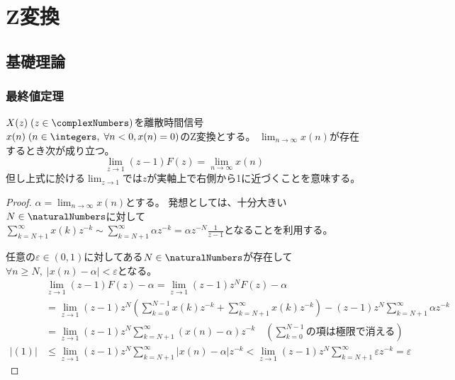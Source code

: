 \part{Z変換}
	\chapter{基礎理論}
		\section{最終値定理}
			\begin{shadebox}
				$X(z)\;(z\in\complexNumbers)$を離散時間信号$x(n)\;(n \in \integers,\;\forall n<0,x(n)=0)$のZ変換とする。
				$\lim_{n\to\infty} x(n)$が存在するとき次が成り立つ。
				\[ \lim_{z\to1}(z-1)F(z) = \lim_{n\to\infty} x(n) \]
				但し上式に於ける$\lim_{z\to1}$では$z$が実軸上で右側から1に近づくことを意味する。
			\end{shadebox}
			\begin{proof}
				\quad\par
				$\alpha = \lim_{n\to\infty} x(n)$とする。
				発想としては、十分大きい$N\in\naturalNumbers$に対して$\sum_{k=N+1}^\infty x(k)z^{-k} \sim \sum_{k=N+1}^\infty \alpha z^{-k} = \alpha z^{-N}\frac{1}{z-1}$となることを利用する。
				\par
				任意の$\varepsilon \in (0,1)$に対してある$N\in\naturalNumbers$が存在して$\forall n\geq N,\;|x(n)-\alpha|<\varepsilon$となる。
				\begin{align}
					\quad &\lim_{z\to1}(z-1)F(z) - \alpha = \lim_{z\to1}(z-1)z^N F(z) - \alpha \nonumber \\
					&= \lim_{z\to1}(z-1)z^N\left(\sum_{k=0}^{N-1} x(k)z^{-k} + \sum_{k=N+1}^\infty x(k)z^{-k}\right) - (z-1)z^N\sum_{k=N+1}^\infty \alpha z^{-k} \nonumber \\
					&= \lim_{z\to1}(z-1)z^N \sum_{k=N+1}^\infty (x(n) - \alpha)z^{-k} \quad \left(\sum_{k=0}^{N-1}\text{の項は極限で消える}\right) \\
					|(1)| &\leq \lim_{z\to1}(z-1)z^N \sum_{k=N+1}^\infty |x(n) - \alpha|z^{-k} < \lim_{z\to1}(z-1)z^N \sum_{k=N+1}^\infty \varepsilon z^{-k} = \varepsilon \nonumber
				\end{align}
			\end{proof}
